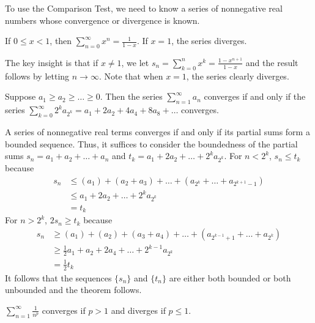 \documentclass{mathnotes}
\begin{document}
\begin{note}
  To use the Comparison Test, we need to know a series of nonnegative real
  numbers whose convergence or divergence is known.
\end{note}

\begin{prop}
  If $0\le x<1$, then $\sum_{n=0}^\infty x^n=\frac{1}{1-x}$. If $x=1$, the
  series diverges.
\end{prop}

\begin{pf}
  The key insight is that if $x\neq1$, we let
  $s_n=\sum_{k=0}^nx^k=\frac{1-x^{n+1}}{1-x}$ and the result follows by letting
  $n\to\infty$. Note that when $x=1$, the series clearly diverges.
\end{pf}

\begin{thm}
  Suppose $a_1\ge a_2\ge\ldots\ge0$. Then the series $\sum_{n=1}^\infty a_n$
  converges if and only if the series
  $\sum_{k=0}^\infty2^ka_{2^k}=a_1+2a_2+4a_4+8a_8+\ldots$ converges.
\end{thm}

\begin{pf}
  A series of nonnegative real terms converges if and only if its partial sums
  form a bounded sequence. Thus, it suffices to consider the boundedness of the
  partial sums $s_n=a_1+a_2+\ldots+a_n$ and $t_k=a_1+2a_2+\ldots+2^ka_{2^k}$.
  For $n<2^k$, $s_n\le t_k$ because
  \begin{align*}
    s_n&\le(a_1)+(a_2+a_3)+\ldots+(a_{2^k}+\ldots+a_{2^{k+1}-1})\\
       &\le a_1+2a_2+\ldots+2^ka_{2^k}\\
       &=t_k
  \end{align*}
  For $n>2^k$, $2s_n\ge t_k$ because
  \begin{align*}
    s_n&\ge(a_1)+(a_2)+(a_3+a_4)+\ldots+(a_{2^{k-1}+1}+\ldots+a_{2^k})\\
       &\ge\frac{1}{2}a_1+a_2+2a_4+\ldots+2^{k-1}a_{2^k}\\
       &=\frac{1}{2}t_k
  \end{align*}
  It follows that the sequences $\{s_n\}$ and $\{t_n\}$ are either both bounded
  or both unbounded and the theorem follows.
\end{pf}

\begin{prop}
  $\sum_{n=1}^\infty\frac{1}{n^p}$ converges if $p>1$ and diverges if $p\le1$.
\end{prop}
\end{document}
